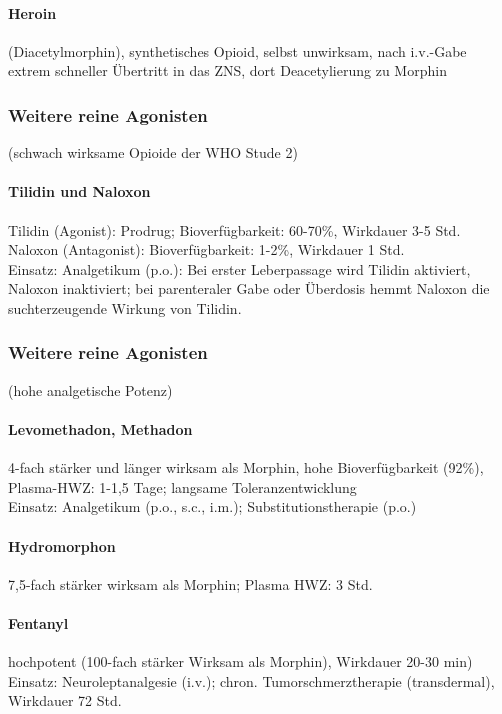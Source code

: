 \documentclass[10pt,a4paper]{report}
\begin{document}
\paragraph{Heroin} %
\label{subp:heroin}
(Diacetylmorphin), synthetisches Opioid, selbst unwirksam, nach i.v.-Gabe extrem schneller Übertritt in das ZNS, dort Deacetylierung zu Morphin
\subsubsection{Weitere reine Agonisten} %
\label{subp:weitere_reine_agonisten}
(schwach wirksame Opioide der WHO Stude 2)
\paragraph{Tilidin und Naloxon} %
\label{subp:tilidin_und_naloxon}
Tilidin (Agonist): Prodrug; Bioverfügbarkeit: 60-70\%, Wirkdauer 3-5 Std. Naloxon (Antagonist): Bioverfügbarkeit: 1-2\%, Wirkdauer 1 Std. \\
Einsatz: Analgetikum (p.o.): Bei erster Leberpassage wird Tilidin aktiviert, Naloxon inaktiviert; bei parenteraler Gabe oder Überdosis hemmt Naloxon die suchterzeugende Wirkung von Tilidin.
\subsubsection{Weitere reine Agonisten} %
\label{par:weitere_reine_agonisten}
(hohe analgetische Potenz)
\paragraph{Levomethadon, Methadon} %
\label{subp:levomethadon_methadon}
4-fach stärker und länger wirksam als Morphin, hohe Bioverfügbarkeit (92\%), Plasma-HWZ: 1-1,5 Tage; langsame Toleranzentwicklung\\
Einsatz: Analgetikum (p.o., s.c., i.m.); Substitutionstherapie (p.o.) 
\paragraph{Hydromorphon} %
\label{subp:hydromorphon}
7,5-fach stärker wirksam als Morphin; Plasma HWZ: 3 Std.
\paragraph{Fentanyl} %
\label{subp:fentanyl}
hochpotent (100-fach stärker Wirksam als Morphin), Wirkdauer 20-30 min)\\ 
Einsatz: Neuroleptanalgesie (i.v.); chron. Tumorschmerztherapie (transdermal), Wirkdauer 72 Std.
\end{document}
